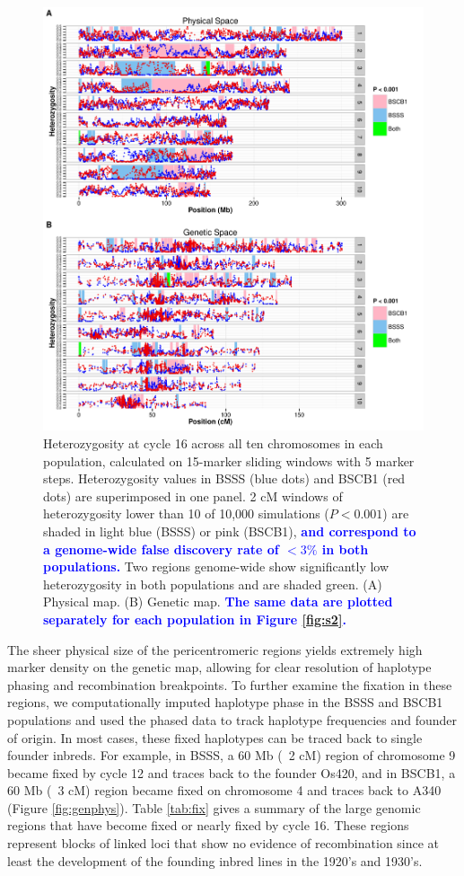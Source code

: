 \documentclass[twocolumn,twoside,letterpaper]{article}
\newcommand{\rev}[1]{\textcolor{blue}{\bf #1}}
\begin{document}
\begin{figure}[tb]   
  \begin{center}
\includegraphics[width=0.7\linewidth]{fig_S2_combined}
   \caption{Heterozygosity at cycle 16 across all ten chromosomes in each population, calculated on 15-marker sliding windows with 5 marker steps. Heterozygosity values in BSSS (blue dots) and BSCB1 (red dots) are superimposed in one panel. 2 cM windows of heterozygosity lower than 10 of 10,000 simulations ($P<0.001$) are shaded in light blue (BSSS) or pink (BSCB1), \rev{and correspond to a genome-wide false discovery rate of $<3\%$ in both populations.} Two regions genome-wide show significantly low heterozygosity in both populations and are shaded green. (A) Physical map. (B) Genetic map. \rev{The same data are plotted separately for each population in Figure \ref{fig:s2}.}} 
    \label{fig:heterotic}
  \end{center}
\end{figure}

The sheer physical size of the pericentromeric regions yields extremely high marker density on the genetic map, allowing for clear resolution of haplotype phasing and recombination breakpoints. 
To further examine the fixation in these regions, we computationally imputed haplotype phase in the BSSS and BSCB1 populations and used the phased data to track haplotype frequencies and founder of origin. 
In most cases, these fixed haplotypes can be traced back to single founder inbreds. 
For example, in BSSS, a 60 Mb (~2 cM) region of chromosome 9 became fixed by cycle 12 and traces back to the founder Os420, and in BSCB1, a 60 Mb (~3 cM) region became fixed on chromosome 4 and traces back to A340 (Figure \ref{fig:genphys}).
Table \ref{tab:fix} gives a summary of the large genomic regions that have become fixed or nearly fixed by cycle 16. 
These regions represent blocks of linked loci that show no evidence of recombination since at least the development of the founding inbred lines in the 1920’s and 1930’s.
	
\end{document}
